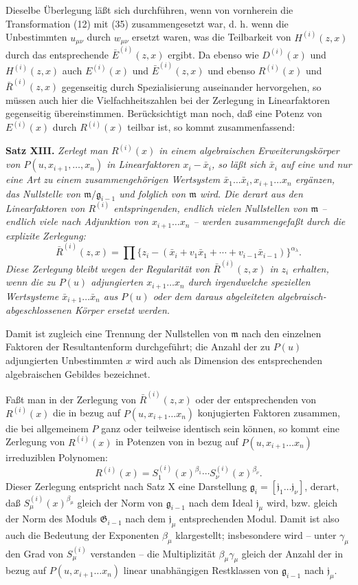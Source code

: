 \documentclass[11pt]{article}
\providecommand{\Gmod}{\mathfrak G}
\providecommand{\mideal}{\mathfrak m}
\providecommand{\gideal}{\mathfrak g}
\providecommand{\jideal}{\mathfrak j}
\begin{document}
Dieselbe Überlegung läßt sich durchführen, wenn von vornherein die Transformation (12) mit (35) zusammengesetzt war, d. h. wenn die Unbestimmten $u_{\mu\nu}$ durch $w_{\mu\nu}$ ersetzt waren, was die Teilbarkeit von $H^{(i)}(z,x)$ durch das entsprechende $\bar E^{(i)}(z,x)$ ergibt. Da ebenso wie $D^{(i)}(x)$ und $H^{(i)}(z,x)$ auch $E^{(i)}(x)$ und $\bar E^{(i)}(z,x)$ und ebenso $R^{(i)}(x)$ und $\bar R^{(i)}(z,x)$ gegenseitig durch Spezialisierung auseinander hervorgehen, so müssen auch hier die Vielfachheitszahlen bei der Zerlegung in Linearfaktoren gegenseitig übereinstimmen. Berücksichtigt man noch, daß eine Potenz von $E^{(i)}(x)$ durch $R^{(i)}(x)$ teilbar ist, so kommt zusammenfassend:

\medskip
\noindent\textbf{Satz XIII.} \emph{Zerlegt man $R^{(i)}(x)$ in einem algebraischen Erweiterungskörper von $P(u,x_{i+1},\ldots,x_n)$ in Linearfaktoren $x_i-\bar x_i$, so läßt sich $\bar x_i$ auf eine und nur eine Art zu einem zusammengehörigen Wertsystem $\bar x_1\ldots\bar x_i,x_{i+1}\ldots x_n$ ergänzen, das Nullstelle von $\mideal/\gideal_{i-1}$ und folglich von $\mideal$ wird. Die derart aus den Linearfaktoren von $R^{(i)}$ entspringenden, endlich vielen Nullstellen von $\mideal$ -- endlich viele nach Adjunktion von $x_{i+1}\ldots x_n$ -- werden zusammengefaßt durch die explizite Zerlegung:}
\begin{equation}
 \bar R^{(i)}(z,x)=\prod\{z_i-(\bar x_i+v_1\bar x_1+\cdots+v_{i-1}\bar x_{i-1})\}^{\alpha_\lambda}.
\tag{36}
\end{equation}
\emph{Diese Zerlegung bleibt wegen der Regularität von $\bar R^{(i)}(z,x)$ in $z_i$ erhalten, wenn die zu $P(u)$ adjungierten $x_{i+1}\ldots x_n$ durch irgendwelche speziellen Wertsysteme $\bar x_{i+1}\ldots\bar x_n$ aus $P(u)$ oder dem daraus abgeleiteten algebraisch-abgeschlossenen Körper ersetzt werden.}

Damit ist zugleich eine Trennung der Nullstellen von $\mideal$ nach den einzelnen Faktoren der Resultantenform durchgeführt; die Anzahl der zu $P(u)$ adjungierten Unbestimmten $x$ wird auch als Dimension des entsprechenden algebraischen Gebildes bezeichnet.

Faßt man in der Zerlegung von $\bar R^{(i)}(z,x)$ oder der entsprechenden von $R^{(i)}(x)$ die in bezug auf $P(u,x_{i+1}\ldots x_n)$ konjugierten Faktoren zusammen, die bei allgemeinem $P$ ganz oder teilweise identisch sein können, so kommt eine Zerlegung von $R^{(i)}(x)$ in Potenzen von in bezug auf $P(u,x_{i+1}\ldots x_n)$ irreduziblen Polynomen:
\[
 R^{(i)}(x)=S^{(i)}_1(x)^{\beta_1}\cdots S^{(i)}_\nu(x)^{\beta_\nu}.
\]
Dieser Zerlegung entspricht nach Satz X eine Darstellung $\gideal_i=[\jideal_1\ldots\jideal_\nu]$, derart, daß $S^{(i)}_\mu(x)^{\beta_\mu}$ gleich der Norm von $\gideal_{i-1}$ nach dem Ideal $\jideal_\mu$ wird, bzw. gleich der Norm des Moduls $\Gmod_{i-1}$ nach dem $\jideal_\mu$ entsprechenden Modul. Damit ist also auch die Bedeutung der Exponenten $\beta_\mu$ klargestellt; insbesondere wird -- unter $\gamma_\mu$ den Grad von $S^{(i)}_\mu$ verstanden -- die Multiplizität $\beta_\mu\gamma_\mu$ gleich der Anzahl der in bezug auf $P(u,x_{i+1}\ldots x_n)$ linear unabhängigen Restklassen von $\gideal_{i-1}$ nach $\jideal_\mu$.
\end{document}
